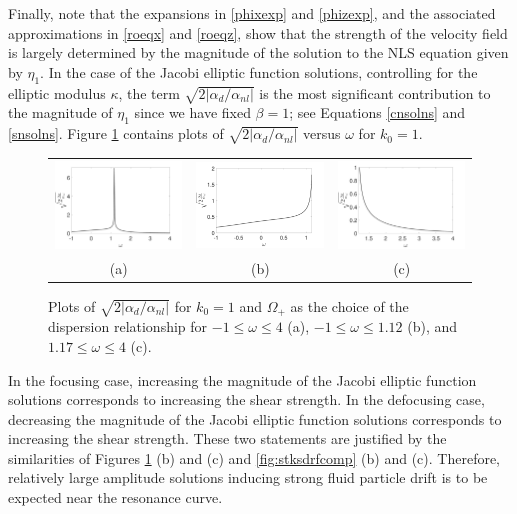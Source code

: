 \documentclass{JFM_Style/jfm}
\begin{document}
Finally, note that the expansions in \eqref{phixexp} and \eqref{phizexp}, and the associated approximations in \eqref{roeqx} and \eqref{roeqz}, show that the strength of the velocity field is largely determined by the magnitude of the solution to the NLS equation given by $\eta_{1}$.  In the case of the Jacobi elliptic function solutions, controlling for the elliptic modulus $\kappa$, the term $\sqrt{2|\alpha_{d}/\alpha_{nl}|}$ is the most significant contribution to the magnitude of $\eta_{1}$ since we have fixed $\beta=1$; see Equations \eqref{cnsolns} and \eqref{snsolns}.  Figure \ref{fig:ampcomps} contains plots of $\sqrt{2|\alpha_{d}/\alpha_{nl}|}$ versus $\omega$ for $k_0=1$.
\begin{figure}
\centering
\begin{tabular}{ccc}
\includegraphics[width=.32\textwidth]{amp_factor_k0_1_wide_range} & \includegraphics[width=.32\textwidth]{amp_factor_k0_1_n1_to_1pt12} & \includegraphics[width=.32\textwidth]{amp_factor_k0_1_1pt2_to_4}\\
(a) & (b) & (c)
\end{tabular}
\caption{\small Plots of $\sqrt{2|\alpha_{d}/\alpha_{nl}|}$ for $k_{0}=1$ and $\Omega_{+}$ as the choice of the dispersion relationship for $-1\leq \omega \leq 4$ (a), $-1\leq \omega \leq 1.12$ (b), and $1.17\leq \omega \leq 4$ (c).}
\label{fig:ampcomps}
\end{figure}
In the focusing case, increasing the magnitude of the Jacobi elliptic function solutions corresponds to increasing the shear strength.  In the defocusing case, decreasing the magnitude of the Jacobi elliptic function solutions corresponds to increasing the shear strength.  These two statements are justified by the similarities of Figures \ref{fig:ampcomps} (b) and (c) and \ref{fig:stksdrfcomp} (b) and (c).  Therefore, relatively large amplitude solutions inducing strong fluid particle drift is to be expected near the resonance curve.  
\end{document}
